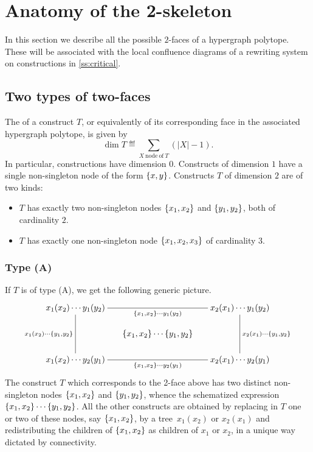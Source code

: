 
\section{Anatomy of the 2-skeleton} 
\label{s:anatomy}

In this section we describe all the possible $2$-faces of a hypergraph polytope.
These will be associated with the local confluence diagrams of a rewriting system on constructions in \cref{ss:critical}.


\subsection{Two types of two-faces} 
\label{two-types}
The  of a construct $T$, or equivalently of its corresponding face in the associated hypergraph polytope, is given by
$$\dim T \eqdef \sum_{X\:\mathrm{node\: of}\: T}(|X|-1).$$
In particular, constructions have dimension $0$. 
Constructs of dimension $1$ have a single non-singleton node of the form $\left\{x,y\right\}$. 
Constructs $T$ of dimension $2$ are of two kinds:
\begin{itemize}
\item[(A)]  $T$ has exactly two non-singleton nodes $\left\{x_1,x_2\right\}$ and $\left\{y_1,y_2\right\}$, both of cardinality $2$. 
\item[(B)] $T$ has exactly one non-singleton node $\left\{x_1,x_2,x_3\right\}$ of cardinality $3$.
\end{itemize}

\subsubsection*{Type (A)}
\label{ss:typeA}
If $T$ is of type (A), we get the following generic picture.
$$ 
\xymatrix @-1.65pc { x_1(x_2)\cdots y_1(y_2) \ar @{-}[dddd]_{x_1(x_2)\cdots \set{y_1,y_2}} 
 \ar @{-}[rrrr]_{\set{x_1,x_2}\cdots y_1(y_2)} &&&& x_2(x_1)\cdots y_1(y_2) \ar @{-}[dddd]^{x_2(x_1)\cdots \set{y_1,y_2}} \\
 &&&&\\
 && \set{x_1,x_2} \cdots \set{y_1,y_2}&&\\
 &&&&\\
 x_1(x_2)\cdots y_2(y_1)  \ar @{-}[rrrr]_{\set{x_1,x_2}\cdots y_2(y_1)} &&  && x_2(x_1)\cdots y_2(y_1)}
 $$
The construct $T$ which corresponds to the 2-face above has two distinct non-singleton nodes $\left\{x_1,x_2\right\}$ and $\left\{y_1,y_2\right\}$, whence the schematized expression  $\left\{x_1,x_2\right\} \cdots \left\{y_1,y_2\right\}$.
All the other constructs are obtained by replacing in $T$ one or two of these nodes, say $\left\{x_1,x_2\right\}$, by a tree~$x_1(x_2)$ or $x_2(x_1)$ and redistributing the children of $\left\{x_1,x_2\right\}$ as children of $x_1$ or $x_2$, in a unique way dictated by connectivity. 

